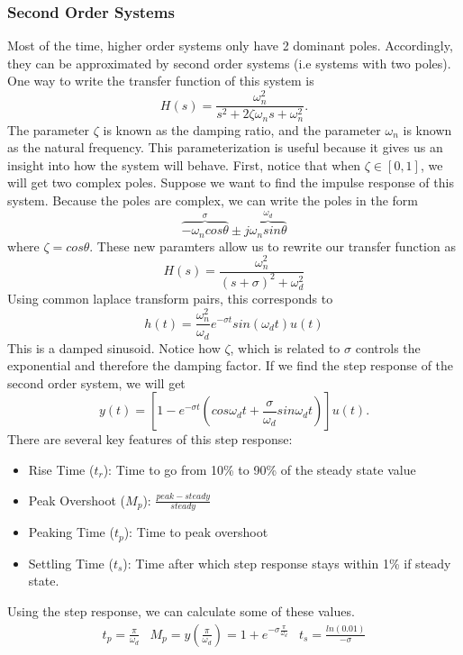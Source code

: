 \subsubsection{Second Order Systems}
Most of the time, higher order systems only have 2 dominant poles. Accordingly, they can be approximated by second order systems (i.e systems with two poles).
One way to write the transfer function of this system is
\[
  H(s)=\frac{\omega_n^2}{s^2+2\zeta\omega_ns+\omega_n^2}.
\]
The parameter $\zeta$ is known as the damping ratio, and the parameter $\omega_n$ is known as the natural frequency.
This parameterization is useful because it gives us an insight into how the system will behave. First, notice that when
$\zeta \in [0, 1]$, we will get two complex poles. Suppose we want to find the impulse response of this system. Because the poles are complex, 
we can write the poles in the form
\[
\overbrace{-\omega_ncos\theta}^{\sigma} \pm j\overbrace{\omega_nsin\theta}^{\omega_d}
\]
where $\zeta=cos\theta$. These new paramters allow us to rewrite our transfer function as
\[
H(s) = \frac{\omega_n^2}{(s+\sigma)^2+\omega_d^2}
\]
Using common laplace transform pairs, this corresponds to
\[
h(t) = \frac{\omega_n^2}{\omega_d}e^{-\sigma t}sin(\omega_dt)u(t)
\]
This is a damped sinusoid. Notice how $\zeta$, which is related to $\sigma$ controls the exponential and therefore the damping factor.
If we find the step response of the second order system, we will get
\[
  y(t) = \left[1-e^{-\sigma t}\left(cos\omega_dt+\frac{\sigma}{\omega_d}sin\omega_dt\right)\right]u(t).
\]
There are several key features of this step response:
\begin{itemize}
    \item Rise Time ($t_r$): Time to go from 10\% to 90\% of the steady state value
    \item Peak Overshoot ($M_p$): $\frac{peak - steady}{steady}$
    \item Peaking Time ($t_p$): Time to peak overshoot
    \item Settling Time ($t_s$): Time after which step response stays within 1\% if steady state.
\end{itemize}
Using the step response, we can calculate some of these values.
\[
    \begin{array}{ccc}
        t_p=\frac{\pi}{\omega_d} & M_p=y\left(\frac{\pi}{\omega_d}\right)=1+e^{-\sigma\frac{\pi}{\omega_d}} & t_s = \frac{ln(0.01)}{-\sigma}
    \end{array}
\]
